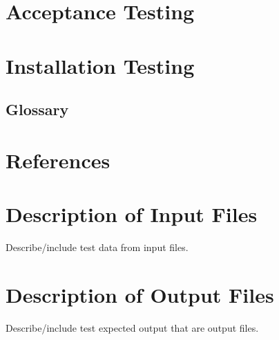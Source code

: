 \documentclass[12pt]{article}
\begin{document}
\section{Acceptance Testing}
\section{Installation Testing}

\subsection{Glossary} \label{glossary}


\section{References}

\appendix

\section{Description of Input Files}

Describe/include test data from input files.

\section{Description of Output Files}

Describe/include test expected output that are output files.
\end{document}
